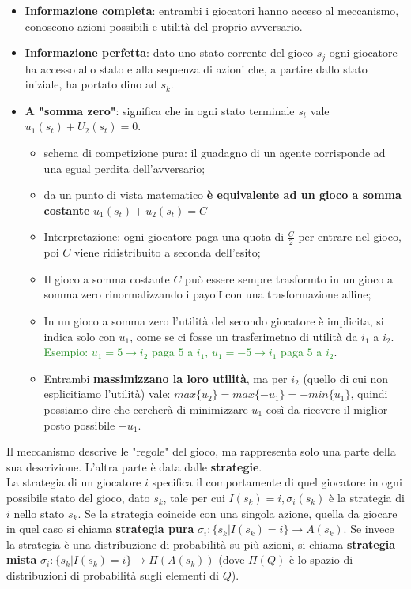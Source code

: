 \documentclass{article}
\begin{document}
\begin{itemize}
    \item \textbf{Informazione completa}: entrambi i giocatori hanno acceso al meccanismo, conoscono azioni possibili e utilità del proprio avversario.
    \item \textbf{Informazione perfetta}: dato uno stato corrente del gioco $s_j$ ogni giocatore ha accesso allo stato e alla sequenza di azioni che, a partire dallo stato iniziale, ha portato dino ad $s_k$.
    \item \textbf{A "somma zero"}: significa che in ogni stato terminale $s_t$ vale $u_1(s_t)+U_2(s_t)=0$.
    \begin{itemize}
        \item schema di competizione pura: il guadagno di un agente corrisponde ad una egual perdita dell'avversario;
        \item da un punto di vista matematico \textbf{è equivalente ad un gioco a somma costante} $u_1(s_t)+u_2(s_t)=C$
        \item Interpretazione: ogni giocatore paga una quota di $\frac{C}{2}$ per entrare nel gioco, poi $C$ viene ridistribuito a seconda dell'esito;
        \item Il gioco a somma costante $C$ può essere sempre trasformto in un gioco a somma zero rinormalizzando i payoff con una trasformazione affine;
        \item In un gioco a somma zero l'utilità del secondo giocatore è implicita, si indica solo con $u_1$, come se ci fosse un trasferimetno di utilità da $i_1$ a $i_2$. \textcolor{ForestGreen}{Esempio: $u_1=5 \rightarrow i_2$ paga $5$ a $i_1$, $u_1=-5 \rightarrow i_1$ paga $5$ a $i_2$}.
        \item Entrambi \textbf{massimizzano la loro utilità}, ma per $i_2$ (quello di cui non esplicitiamo l'utilità) vale: $max\{u_2\} = max\{-u_1\}= -min\{u_1\}$, quindi possiamo dire che cercherà di minimizzare $u_1$ così da ricevere il miglior posto possibile $-u_1$.
    \end{itemize}
\end{itemize} 
Il meccanismo descrive le "regole" del gioco, ma rappresenta solo una parte della sua descrizione.
L'altra parte è data dalle \textbf{strategie}.
\\ La strategia di un giocatore $i$ specifica il comportamente di quel giocatore in ogni possibile stato del gioco, dato $s_k$, tale per cui $I(s_k)=i,\sigma_i(s_k)$ è la strategia di $i$ nello stato $s_k$. Se la strategia coincide con una singola azione, quella da giocare in quel caso si chiama \textbf{strategia pura} $\sigma_i:\{s_k | I(s_k)=i\} \rightarrow A(s_k)$. Se invece la strategia è una distribuzione di probabilità su più azioni, si chiama \textbf{strategia mista} $\sigma_i:\{s_k|I(s_k)=i\} \rightarrow \Pi(A(s_k))$ (dove $\Pi(Q)$ è lo spazio di distribuzioni di probabilità sugli elementi di $Q$).
\end{document}

